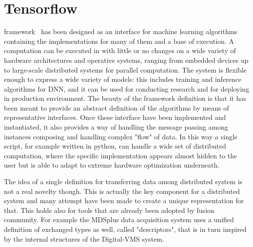 %

\section{Tensorflow}

\Tensorflow framework~\cite{tensorflow2015-whitepaper} has been designed as an interface for machine learning algorithms containing the implementations for many of them and a base of execution. A computation can be executed in \Tensorflow with little or no changes on a wide variety of hardware architectures and operative systems, ranging from embedded devices up to large-scale distributed systems for parallel computation. The system is flexible enough to express a wide variety of models: this includes training and inference algorithms for \acs{DNN}, and it can be used for conducting research and for deploying in production environment. 
The beauty of the framework definition is that it has been meant to provide an abstract definition of the algorithms by means of representative interfaces. Once these interface have been implemented and instantiated, it also provides a way of handling the message passing among instances composing and handling complex "flow" of data. In this way a single script, for example written in python, can handle a wide set of distributed computation, where the specific implementation appears almost hidden to the user but is able to adapt to extreme hardware optimization underneath.

The idea of a single definition for transferring data among distributed system is not a real novelty though. This is actually the key component for a distributed system and many attempt have been made to create a unique representation for that. 
This holds also for tools that are already been adopted by fusion community. For example the MDSplus data acquisition system uses a unified definition of exchanged types as well, called "descriptors", that is in turn inspired by the internal structures of the Digital-VMS system.





